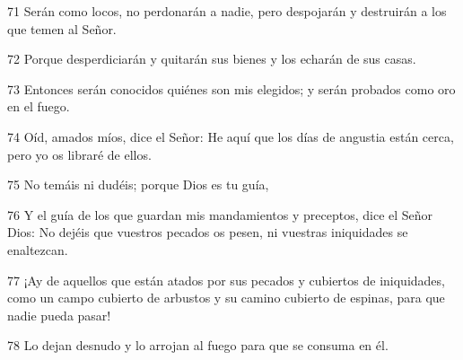 \par 71 Serán como locos, no perdonarán a nadie, pero despojarán y destruirán a los que temen al Señor.
\par 72 Porque desperdiciarán y quitarán sus bienes y los echarán de sus casas.
\par 73 Entonces serán conocidos quiénes son mis elegidos; y serán probados como oro en el fuego.
\par 74 Oíd, amados míos, dice el Señor: He aquí que los días de angustia están cerca, pero yo os libraré de ellos.
\par 75 No temáis ni dudéis; porque Dios es tu guía,
\par 76 Y el guía de los que guardan mis mandamientos y preceptos, dice el Señor Dios: No dejéis que vuestros pecados os pesen, ni vuestras iniquidades se enaltezcan.
\par 77 ¡Ay de aquellos que están atados por sus pecados y cubiertos de iniquidades, como un campo cubierto de arbustos y su camino cubierto de espinas, para que nadie pueda pasar!
\par 78 Lo dejan desnudo y lo arrojan al fuego para que se consuma en él.

